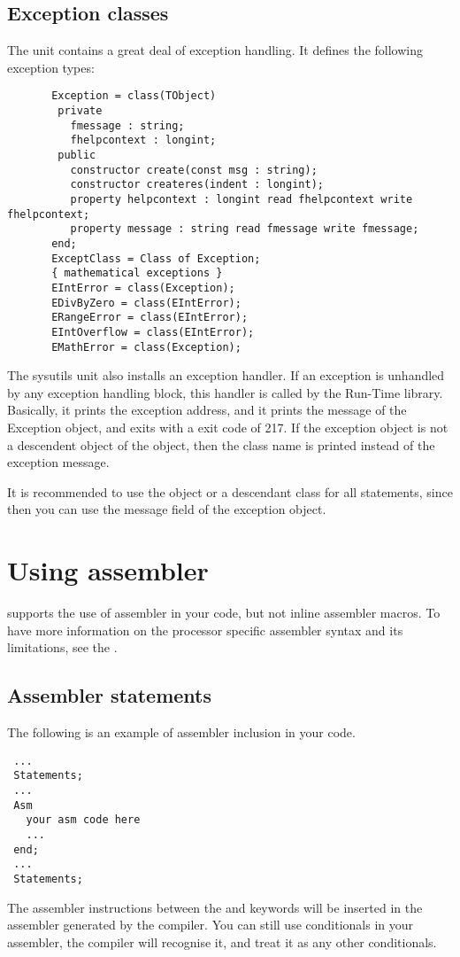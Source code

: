 \documentclass{report}
\begin{document}
\section{Exception classes}
\label{se:exceptclasses}
The  unit contains a great deal of exception handling.
It defines the following exception types:
\begin{verbatim}
       Exception = class(TObject)
        private
          fmessage : string;
          fhelpcontext : longint;
        public
          constructor create(const msg : string);
          constructor createres(indent : longint);
          property helpcontext : longint read fhelpcontext write fhelpcontext;
          property message : string read fmessage write fmessage;
       end;
       ExceptClass = Class of Exception;
       { mathematical exceptions }
       EIntError = class(Exception);
       EDivByZero = class(EIntError);
       ERangeError = class(EIntError);
       EIntOverflow = class(EIntError);
       EMathError = class(Exception);
\end{verbatim}
The sysutils unit also installs an exception handler. If an exception is
unhandled by any exception handling block, this handler is called by the
Run-Time library. Basically, it prints the exception address, and it prints
the message of the Exception object, and exits with a exit code of 217.
If the exception object is not a descendent object of the 
object, then the class name is printed instead of the exception message.

It is recommended to use the  object or a descendant class for
all  statements, since then you can use the message field of the
exception object.

\chapter{Using assembler}
\fpc supports the use of assembler in your code, but not inline
assembler macros.  To have more information on the processor
specific assembler syntax and its limitations, see the \progref.

\section{Assembler statements }
The following is an example of assembler inclusion in your code.
\begin{verbatim}
 ...
 Statements;
 ...
 Asm
   your asm code here
   ...
 end;
 ...
 Statements;
\end{verbatim}
The assembler instructions between the  and  keywords will
be inserted in the assembler generated by the compiler.
You can still use conditionals in your assembler, the compiler will
recognise it, and treat it as any other conditionals.
\end{document}
